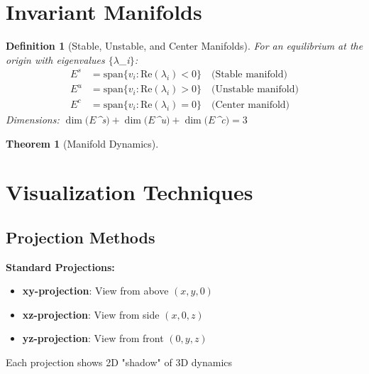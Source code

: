 \documentclass[12pt]{article}
\newtheorem{definition}{Definition}
\newtheorem{theorem}{Theorem}
\begin{document}
\section{Invariant Manifolds}

\begin{definition}[Stable, Unstable, and Center Manifolds]
For an equilibrium at the origin with eigenvalues $\{\lambda$_{i}$\}$:
\begin{align}
E^{s} &= \text{span}\{v_{i} : \text{Re}(\lambda_{i}) < 0\} \quad \text{(Stable manifold)} \\
E^{u} &= \text{span}\{v_{i} : \text{Re}(\lambda_{i}) > 0\} \quad \text{(Unstable manifold)} \\
E^{c} &= \text{span}\{v_{i} : \text{Re}(\lambda_{i}) = 0\} \quad \text{(Center manifold)}
\end{align}
Dimensions: $\dim(E$^{s}$) + \dim(E$^{u}$) + \dim(E$^{c}$) = 3$
\end{definition}

\begin{theorem}[Manifold Dynamics]
\end{theorem}

\section{Visualization Techniques}

\subsection{Projection Methods}

\begin{visualization}
\textbf{Standard Projections:}
\begin{itemize}
    \item \textbf{xy-projection}: View from above $(x,y,0)$
    \item \textbf{xz-projection}: View from side $(x,0,z)$
    \item \textbf{yz-projection}: View from front $(0,y,z)$
\end{itemize}
Each projection shows 2D "shadow" of 3D dynamics
\end{visualization}
\end{document}
